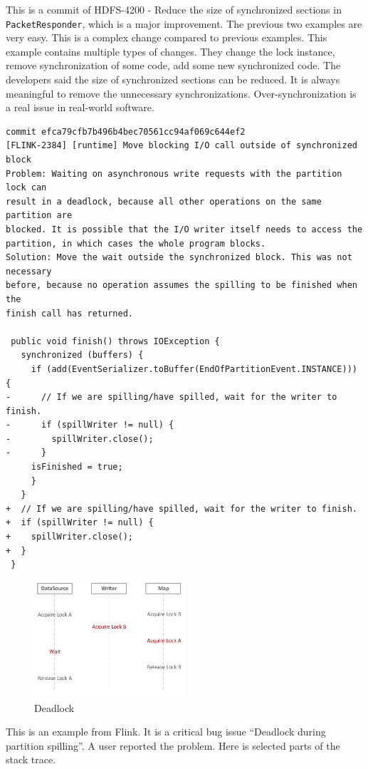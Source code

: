 This is a commit of HDFS-4200 - Reduce the size of synchronized sections in \texttt{PacketResponder}, which is a major improvement. The previous two examples are very easy. This is a complex change compared to previous examples. This example contains multiple types of changes. They change the lock instance, remove synchronization of some code, add some new synchronized code. The developers said the size of synchronized sections can be reduced. It is always meaningful to remove the unnecessary synchronizations. Over-synchronization \cite{conf/sigsoft/GuJSZL15} is a real issue in real-world software.

\begin{lstlisting}
commit efca79cfb7b496b4bec70561cc94af069c644ef2
[FLINK-2384] [runtime] Move blocking I/O call outside of synchronized block
Problem: Waiting on asynchronous write requests with the partition lock can
result in a deadlock, because all other operations on the same partition are
blocked. It is possible that the I/O writer itself needs to access the
partition, in which cases the whole program blocks.
Solution: Move the wait outside the synchronized block. This was not necessary
before, because no operation assumes the spilling to be finished when the
finish call has returned.

 public void finish() throws IOException {
   synchronized (buffers) {
     if (add(EventSerializer.toBuffer(EndOfPartitionEvent.INSTANCE))) {
-      // If we are spilling/have spilled, wait for the writer to finish.
-      if (spillWriter != null) {
-        spillWriter.close();
-      }
     isFinished = true;
     }
   }
+  // If we are spilling/have spilled, wait for the writer to finish.
+  if (spillWriter != null) {
+    spillWriter.close();
+  }
 }
\end{lstlisting}

\begin{figure}
	\centering
	\includegraphics[height=1.7in]{deadlock}
	\caption{Deadlock}
\end{figure}

This is an example from Flink. It is a critical bug issue ``Deadlock during partition spilling''. A user reported the problem. Here is selected parts of the stack trace.

